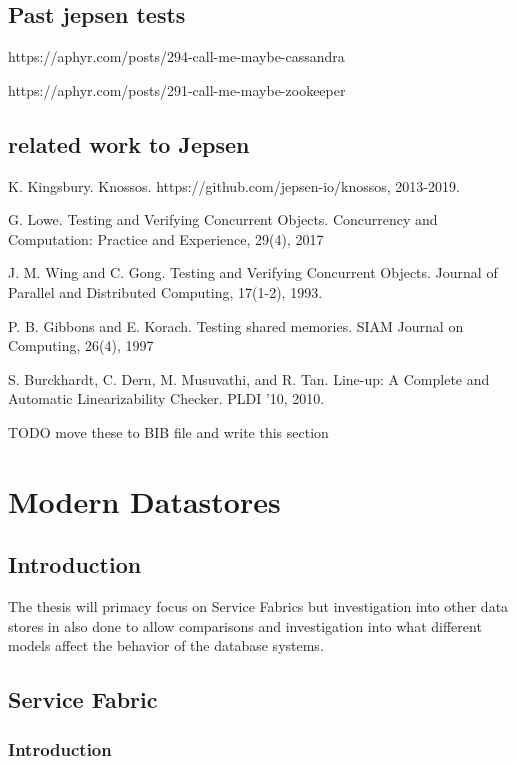 \documentclass[a4paper,10pt,titlepage]{report}
\begin{document}
\section{Past jepsen tests}

https://aphyr.com/posts/294-call-me-maybe-cassandra


https://aphyr.com/posts/291-call-me-maybe-zookeeper



\section{related work to Jepsen}


K. Kingsbury. Knossos.
https://github.com/jepsen-io/knossos, 2013-2019.

G. Lowe. Testing and Verifying Concurrent Objects.
Concurrency and Computation: Practice and
Experience, 29(4), 2017

J. M. Wing and C. Gong. Testing and Verifying
Concurrent Objects. Journal of Parallel and
Distributed Computing, 17(1-2), 1993.

P. B. Gibbons and E. Korach. Testing shared
memories. SIAM Journal on Computing, 26(4), 1997

S. Burckhardt, C. Dern, M. Musuvathi, and R. Tan.
Line-up: A Complete and Automatic Linearizability
Checker. PLDI '10, 2010.


TODO move these to BIB file and write this section





\newpage
\chapter{Modern Datastores}

\section{Introduction}

The thesis will primacy focus on Service Fabrics but investigation into other data stores in also done to allow comparisons and investigation into what different models affect the behavior of the database systems.

\section{Service Fabric}
\subsection{Introduction}
\end{document}

